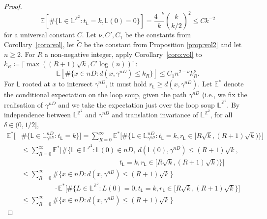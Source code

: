 \documentclass[10pt,a4paper]{amsart}
\begin{document}
\begin{proof}
    \begin{equation}
    \label{eq:temp:mass}
    \mathbb{E}[\# \{ \mathsf{L}\in \mathbb{L}^{\mathbb{Z}^2}: t_\mathsf{L}=k, \mathsf{L}(0)=0 \} ] =\frac{4^{-k}}{k}\binom{k}{k/2}^2 \leq Ck^{-2}
    \end{equation}
    for a universal constant $C$.
    Let $\nu, C',C_1$ be the constants from Corollary~\ref{coro:vol}, let $\tilde C$ be the constant from Proposition \ref{prop:vol2} and let $n\geq 2$.
    For $R$ a non-negative integer, apply Corollary~\ref{coro:vol} to $k_R\coloneqq\lceil \max((R+1)\sqrt{k},  C' \log(n) )\rceil $:
    \begin{equation}
    \label{eq:temp:card}
    \mathbb{E}[\#\{ x\in n D: d(x,\gamma^{nD})\leq k_R  \}] \leq C_1  n^{2-\nu} k_R^{\nu}.
    \end{equation}
    For $\mathsf{L}$ rooted at $x$ to intersect $\gamma^{nD}$, it must hold $r_\mathsf{L}\geq d(x,\gamma^{nD})$. Let $\mathbb{E}^*$ denote the conditional expectation on the loop soup, given the path $\gamma^{nD}$ (i.e., we fix the realisation of $\gamma^{nD}$ and we take the expectation just over the loop soup $\mathbb{L}^{\mathbb{Z}^2}$. 
    By independence between $\mathbb{L}^{\mathbb{Z}^2}$ and $\gamma^{nD}$ and translation invariance of $\mathbb{L}^{\mathbb{Z}^2}$, for all $\delta\in(0,1/2]$, 
    \begin{align*}
    \mathbb{E}^*\Big[ &\#   \{   \mathsf{L}\in \mathbb{L}^{nD}_{\gamma^{nD}}: t_\mathsf{L}=k \}  \Big]
    = \sum_{R=0}^\infty
    \mathbb{E}^*\big[\# \{\mathsf{L}\in  \mathbb{L}^{nD}_{\gamma^{nD} } : t_\mathsf{L}=k, r_{\mathsf{L}}\in [R\sqrt{k}, (R+1)\sqrt{k}   )   \} \big]\\
    &	\leq \sum_{R=0}^\infty
    \mathbb{E}^*\big[\# \{\mathsf{L}\in  \mathbb{L}^{\mathbb{Z}^2} :
    \mathsf{L}(0)\in nD, \
    d(\mathsf{L}(0),\gamma^{nD})\leq (R+1)\sqrt{k}, \\
    &\hspace{6cm}
    t_\mathsf{L}=k, r_{\mathsf{L}}\in [R\sqrt{k}, (R+1)\sqrt{k}   )   \} \big]\\
    &	\leq \sum_{R=0}^\infty  \#
    \{  x\in n D : d(x,\gamma^{nD} )\leq  (R+1) \sqrt{k}  \}
    \\
    &\hspace{2cm}\cdot \mathbb{E}^*\big[\# \{L\in \mathbb{L}^{\mathbb{Z}^2}: L(0)=0, t_\mathsf{L}=k, r_{\mathsf{L}}\in [R\sqrt{k}, (R+1)\sqrt{k}  \} \big]\\
    &	\leq \sum_{R=0}^\infty  \#
    \big\{  x\in n D : d(x,\gamma^{nD} )\leq  (R+1) \sqrt{k}  \big\}

\end{align*}
\end{proof}
\end{document}
